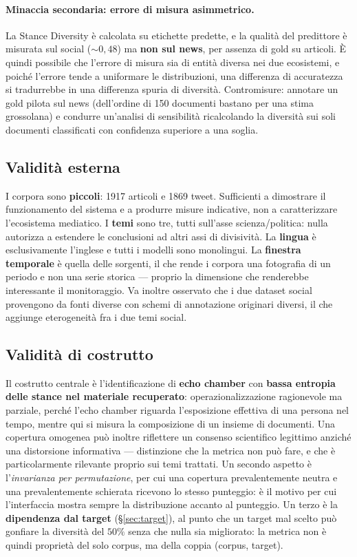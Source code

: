 \documentclass[11pt,a4paper]{report}
\begin{document}
\paragraph{Minaccia secondaria: errore di misura asimmetrico.} La Stance Diversity è calcolata su
etichette predette, e la qualità del predittore è misurata sul social ($\sim\!0{,}48$) ma
\textbf{non sul news}, per assenza di gold su articoli. È quindi possibile che l'errore di misura
sia di entità diversa nei due ecosistemi, e poiché l'errore tende a uniformare le distribuzioni,
una differenza di accuratezza si tradurrebbe in una differenza spuria di diversità. Contromisure:
annotare un gold pilota sul news (dell'ordine di 150 documenti bastano per una stima grossolana) e
condurre un'analisi di sensibilità ricalcolando la diversità sui soli documenti classificati con
confidenza superiore a una soglia.

\subsection{Validità esterna}
I corpora sono \textbf{piccoli}: 1917 articoli e 1869 tweet. Sufficienti a dimostrare il
funzionamento del sistema e a produrre misure indicative, non a caratterizzare l'ecosistema
mediatico. I \textbf{temi} sono tre, tutti sull'asse scienza/politica: nulla autorizza a estendere
le conclusioni ad altri assi di divisività. La \textbf{lingua} è esclusivamente l'inglese e tutti i
modelli sono monolingui. La \textbf{finestra temporale} è quella delle sorgenti, il che rende i
corpora una fotografia di un periodo e non una serie storica --- proprio la dimensione che
renderebbe interessante il monitoraggio. Va inoltre osservato che i due dataset social provengono da
fonti diverse con schemi di annotazione originari diversi, il che aggiunge eterogeneità fra i due
temi social.

\subsection{Validità di costrutto}
Il costrutto centrale è l'identificazione di \textbf{echo chamber} con \textbf{bassa entropia delle
stance nel materiale recuperato}: operazionalizzazione ragionevole ma parziale, perché l'echo
chamber riguarda l'esposizione effettiva di una persona nel tempo, mentre qui si misura la
composizione di un insieme di documenti. Una copertura omogenea può inoltre riflettere un consenso
scientifico legittimo anziché una distorsione informativa --- distinzione che la metrica non può
fare, e che è particolarmente rilevante proprio sui temi trattati. Un secondo aspetto è
l'\emph{invarianza per permutazione}, per cui una copertura prevalentemente neutra e una
prevalentemente schierata ricevono lo stesso punteggio: è il motivo per cui l'interfaccia mostra
sempre la distribuzione accanto al punteggio. Un terzo è la \textbf{dipendenza dal target}
(\S\ref{sec:target}), al punto che un target mal scelto può gonfiare la diversità del $50\%$ senza
che nulla sia migliorato: la metrica non è quindi proprietà del solo corpus, ma della coppia
(corpus, target).
\end{document}
